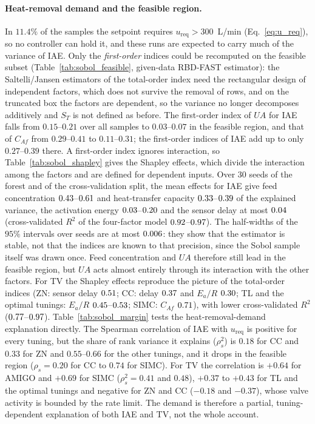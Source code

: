 \documentclass[11pt]{article}
\begin{document}
\paragraph{Heat-removal demand and the feasible region.} In $11.4\%$ of the samples the setpoint requires $u_{\mathrm{req}} > 300$~L/min (Eq.~\eqref{eq:u_req}), so no controller can hold it, and these runs are expected to carry much of the variance of IAE. Only the \emph{first-order} indices could be recomputed on the feasible subset (Table~\ref{tab:sobol_feasible}, given-data RBD-FAST estimator): the Saltelli/Jansen estimators of the total-order index need the rectangular design of independent factors, which does not survive the removal of rows, and on the truncated box the factors are dependent, so the variance no longer decomposes additively and $S_T$ is not defined as before. The first-order index of $UA$ for IAE falls from $0.15$--$0.21$ over all samples to $0.03$--$0.07$ in the feasible region, and that of $C_{Af}$ from $0.29$--$0.41$ to $0.11$--$0.31$; the first-order indices of IAE add up to only $0.27$--$0.39$ there. A first-order index ignores interaction, so Table~\ref{tab:sobol_shapley} gives the Shapley effects, which divide the interaction among the factors and are defined for dependent inputs. Over $30$ seeds of the forest and of the cross-validation split, the mean effects for IAE give feed concentration $0.43$--$0.61$ and heat-transfer capacity $0.33$--$0.39$ of the explained variance, the activation energy $0.03$--$0.20$ and the sensor delay at most $0.04$ (cross-validated $R^2$ of the four-factor model $0.92$--$0.97$). The half-widths of the $95\%$ intervals over seeds are at most $0.006$: they show that the estimator is stable, not that the indices are known to that precision, since the Sobol sample itself was drawn once. Feed concentration and $UA$ therefore still lead in the feasible region, but $UA$ acts almost entirely through its interaction with the other factors. For TV the Shapley effects reproduce the picture of the total-order indices (ZN: sensor delay $0.51$; CC: delay $0.37$ and $E_a/R$ $0.30$; TL and the optimal tunings: $E_a/R$ $0.45$--$0.53$; SIMC: $C_{Af}$ $0.71$), with lower cross-validated $R^2$ ($0.77$--$0.97$). Table~\ref{tab:sobol_margin} tests the heat-removal-demand explanation directly. The Spearman correlation of IAE with $u_{\mathrm{req}}$ is positive for every tuning, but the share of rank variance it explains ($\rho_s^2$) is $0.18$ for CC and $0.33$ for ZN and $0.55$--$0.66$ for the other tunings, and it drops in the feasible region ($\rho_s = 0.20$ for CC to $0.74$ for SIMC). For TV the correlation is $+0.64$ for AMIGO and $+0.69$ for SIMC ($\rho_s^2 = 0.41$ and $0.48$), $+0.37$ to $+0.43$ for TL and the optimal tunings and negative for ZN and CC ($-0.18$ and $-0.37$), whose valve activity is bounded by the rate limit. The demand is therefore a partial, tuning-dependent explanation of both IAE and TV, not the whole account.
\end{document}
